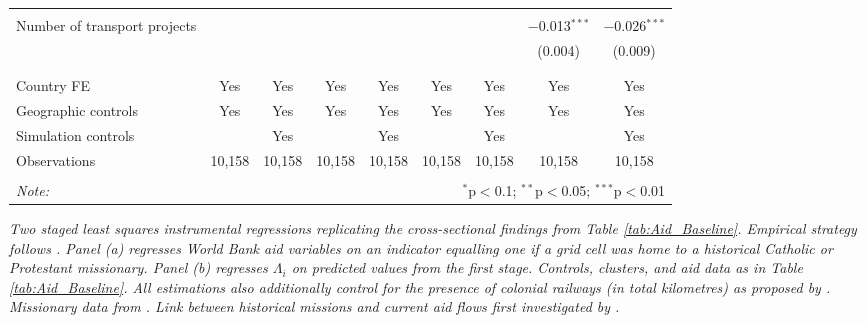 \documentclass[11pt, oneside]{article}   	%
\newcommand{\mysubcaption}[1]{
\justify
\begin{spacing}{0.7}
\textit{\footnotesize #1}
\end{spacing}}
\begin{document}
\begin{table}[!h]
{\begin{tabular}{@{\extracolsep{5pt}}lcccccccc}
 & & & & & & & & \\
Number of transport projects &  &  &  &  &  &  & $-$0.013$^{***}$ & $-$0.026$^{***}$ \\
 &  &  &  &  &  &  & (0.004) & (0.009) \\
 & & & & & & & & \\
\hline \\[-1.8ex]
Country FE & Yes & Yes & Yes & Yes & Yes & Yes & Yes & Yes \\
Geographic controls & Yes & Yes & Yes & Yes & Yes & Yes & Yes & Yes \\
Simulation controls &  & Yes &  & Yes &  & Yes &  & Yes \\
Observations & 10,158 & 10,158 & 10,158 & 10,158 & 10,158 & 10,158 & 10,158 & 10,158 \\
 \hline
 \hline \\[-1.8ex]
 \textit{Note:}  & \multicolumn{8}{r}{$^{*}$p$<$0.1; $^{**}$p$<$0.05; $^{***}$p$<$0.01} \\
 \end{tabular}


}

\mysubcaption{Two staged least squares instrumental regressions replicating the cross-sectional findings from Table \eqref{tab:Aid_Baseline}. Empirical strategy follows \cite{Castello-Climent_HigherEducationProsperity_2017}. Panel (a) regresses World Bank aid variables on an indicator equalling one if a grid cell was home to a historical Catholic or Protestant missionary. Panel (b) regresses $\Lambda_{i}$ on predicted values from the first stage. Controls, clusters, and aid data as in Table \eqref{tab:Aid_Baseline}. All estimations also additionally control for the presence of colonial railways (in total kilometres) as proposed by \citeauthor{Castello-Climent_HigherEducationProsperity_2017}. Missionary data from \cite{Nunn_ReligiousConversionColonial_2010}. Link between historical missions and current aid flows first investigated by \cite{Alpino_LightingPathInfluence_2017}.}
\end{table}
\end{document}
